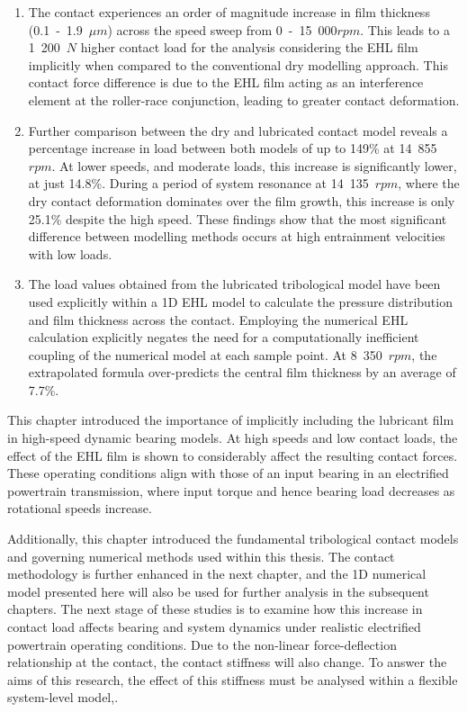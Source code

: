 \begin{enumerate}
	\item The contact experiences an order of magnitude increase in film thickness (0.1~-~1.9~$\mu m$) across the speed sweep from 0~-~15~000$rpm$. This leads to a 1~200~$N$ higher contact load for the analysis considering the EHL film implicitly when compared to the conventional dry modelling approach. This contact force difference is due to the EHL film acting as an interference element at the roller-race conjunction, leading to greater contact deformation.
	\item Further comparison between the dry and lubricated contact model reveals a percentage increase in load between both models of up to 149\% at 14~855~$rpm$. At lower speeds, and moderate loads, this increase is significantly lower, at just 14.8\%. During a period of system resonance at 14~135~$rpm$, where the dry contact deformation dominates over the film growth, this increase is only 25.1\% despite the high speed. These findings show that the most significant difference between modelling methods occurs at high entrainment velocities with low loads.
	\item The load values obtained from the lubricated tribological model have been used explicitly within a 1D EHL model to calculate the pressure distribution and film thickness across the contact. Employing the numerical EHL calculation explicitly negates the need for a computationally inefficient coupling of the numerical model at each sample point. At 8~350~$rpm$, the extrapolated formula over-predicts the central film thickness by an average of 7.7\%.
\end{enumerate}

This chapter introduced the importance of implicitly including the lubricant film in high-speed dynamic bearing models. At high speeds and low contact loads, the effect of the EHL film is shown to considerably affect the resulting contact forces. These operating conditions align with those of an input bearing in an electrified powertrain transmission, where input torque and hence bearing load decreases as rotational speeds increase. 

Additionally, this chapter introduced the fundamental tribological contact models and governing numerical methods used within this thesis. The contact methodology is further enhanced in the next chapter, and the 1D numerical model presented here will also be used for further analysis in the subsequent chapters. The next stage of these studies is to examine how this increase in contact load affects bearing and system dynamics under realistic electrified powertrain operating conditions. Due to the non-linear force-deflection relationship at the contact, the contact stiffness will also change. To answer the aims of this research, the effect of this stiffness must be analysed within a flexible system-level model,.